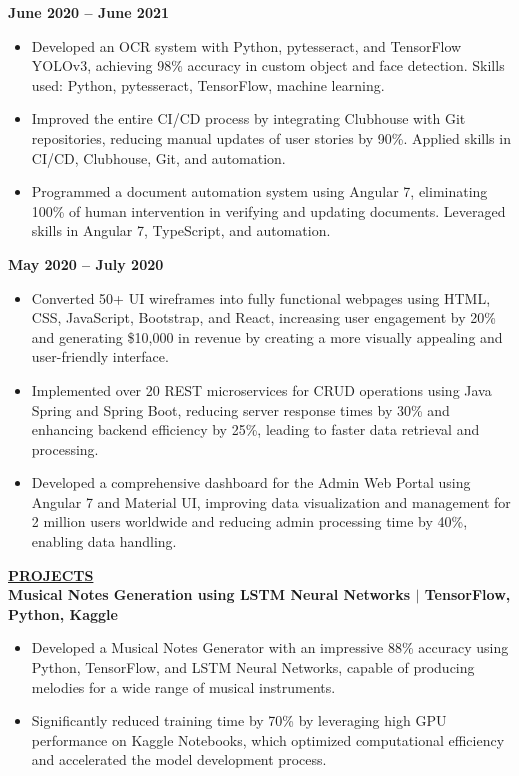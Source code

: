 \documentclass{article}
\begin{document}
 \hfill \textbf{June 2020 – June 2021}
\begin{itemize}[noitemsep,nolistsep,leftmargin=*]
\item Developed an OCR system with Python, pytesseract, and TensorFlow YOLOv3, achieving 98\% accuracy in custom object and face detection. Skills used: Python, pytesseract, TensorFlow, machine learning.
\item Improved the entire CI/CD process by integrating Clubhouse with Git repositories, reducing manual updates of user stories by 90\%. Applied skills in CI/CD, Clubhouse, Git, and automation.
\item Programmed a document automation system using Angular 7, eliminating 100\% of human intervention in verifying and updating documents. Leveraged skills in Angular 7, TypeScript, and automation.
\end{itemize}

\vspace{1mm}

 \hfill \textbf{May 2020 – July 2020}
\begin{itemize}[noitemsep,nolistsep,leftmargin=*]
\item Converted 50+ UI wireframes into fully functional webpages using HTML, CSS, JavaScript, Bootstrap, and React, increasing user engagement by 20\% and generating \$10,000 in revenue by creating a more visually appealing and user-friendly interface.
\item Implemented over 20 REST microservices for CRUD operations using Java Spring and Spring Boot, reducing server response times by 30\% and enhancing backend efficiency by 25\%, leading to faster data retrieval and processing.
\item Developed a comprehensive dashboard for the Admin Web Portal using Angular 7 and Material UI, improving data visualization and management for 2 million users worldwide and reducing admin processing time by 40\%, enabling data handling.
\end{itemize}

\vspace{1mm}
\noindent \textbf{\underline{PROJECTS}} \\
\textbf{Musical Notes Generation using LSTM Neural Networks $\mid$ TensorFlow, Python, Kaggle}
\begin{itemize}[noitemsep,nolistsep,leftmargin=*]
\item Developed a Musical Notes Generator with an impressive 88\% accuracy using Python, TensorFlow, and LSTM Neural Networks, capable of producing melodies for a wide range of musical instruments.
\item Significantly reduced training time by 70\% by leveraging high GPU performance on Kaggle Notebooks, which optimized computational efficiency and accelerated the model development process.
\end{itemize}
\vspace{1mm}
\end{document}

